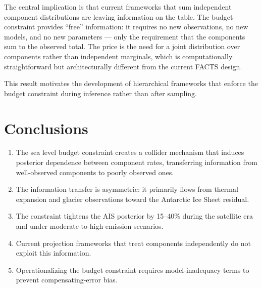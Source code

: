 \documentclass[11pt]{article}
\begin{document}
The central implication is that current frameworks that sum independent component distributions are leaving information on the table.  The budget constraint provides ``free'' information: it requires no new observations, no new models, and no new parameters --- only the requirement that the components sum to the observed total.  The price is the need for a joint distribution over components rather than independent marginals, which is computationally straightforward but architecturally different from the current FACTS design.

This result motivates the development of hierarchical frameworks that enforce the budget constraint during inference rather than after sampling.


\section{Conclusions}
\label{sec:conclusions}

\begin{enumerate}
  \item The sea level budget constraint creates a collider mechanism that induces posterior dependence between component rates, transferring information from well-observed components to poorly observed ones.
  \item The information transfer is asymmetric: it primarily flows from thermal expansion and glacier observations toward the Antarctic Ice Sheet residual.
  \item The constraint tightens the AIS posterior by 15--40\% during the satellite era and under moderate-to-high emission scenarios.
  \item Current projection frameworks that treat components independently do not exploit this information.
  \item Operationalizing the budget constraint requires model-inadequacy terms to prevent compensating-error bias.
\end{enumerate}




\end{document}
